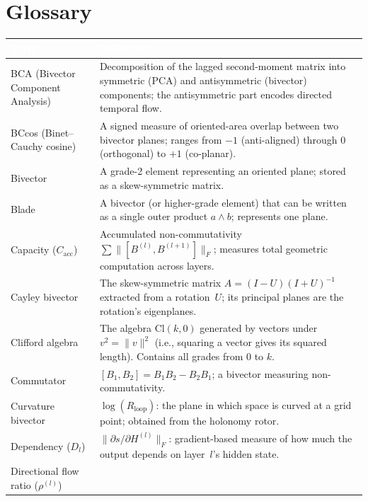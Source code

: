 \documentclass[11pt, twoside, openright]{memoir}
\newcommand{\op}{\wedge}          %
\numberwithin{equation}{chapter}
\begin{document}
\backmatter

\chapter*{Glossary}

\begin{center}
\renewcommand{\arraystretch}{1.5}\small
\begin{tabular}{@{}L{4cm} L{7.5cm}@{}}
\toprule
{}
\textcolor{white}{\textbf{Term}} &
\textcolor{white}{\textbf{Definition}} \\
\midrule
BCA (Bivector Component Analysis) &
  Decomposition of the lagged second-moment matrix into symmetric
  (PCA) and antisymmetric (bivector) components; the antisymmetric
  part encodes directed temporal flow. \\
BCcos (Binet--Cauchy cosine) &
  A signed measure of oriented-area overlap between two bivector planes;
  ranges from $-1$ (anti-aligned) through $0$ (orthogonal) to $+1$ (co-planar). \\
Bivector &
  A grade-2 element representing an oriented plane; stored as a
  skew-symmetric matrix. \\
Blade &
  A bivector (or higher-grade element) that can be written as a single
  outer product $a \op b$; represents one plane. \\
Capacity ($C_{\mathrm{acc}}$) &
  Accumulated non-commutativity $\sum \|[B^{(l)}, B^{(l+1)}]\|_F$;
  measures total geometric computation across layers. \\
Cayley bivector &
  The skew-symmetric matrix $A = (I - U)(I + U)^{-1}$ extracted from
  a rotation~$U$; its principal planes are the rotation's eigenplanes. \\
Clifford algebra &
  The algebra $\mathrm{Cl}(k, 0)$ generated by vectors under
  $v^2 = \|v\|^2$ (i.e., squaring a vector gives its squared length).  Contains all grades from 0 to $k$. \\
Commutator &
  $[B_1, B_2] = B_1 B_2 - B_2 B_1$; a bivector measuring
  non-commutativity. \\
Curvature bivector &
  $\log(R_{\text{loop}})$: the plane in which space is curved at a
  grid point; obtained from the holonomy rotor. \\
Dependency ($D_l$) &
  $\|\partial s / \partial H^{(l)}\|_F$: gradient-based measure of how
  much the output depends on layer~$l$'s hidden state. \\
Directional flow ratio ($\rho^{(l)}$) &

\end{tabular}
\end{center}
\end{document}
